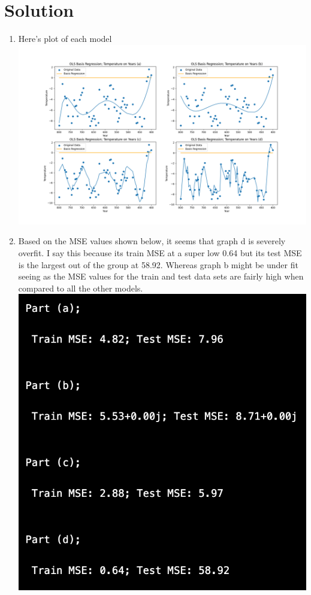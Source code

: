 \documentclass[submit]{harvardml}
\newenvironment{solution}
  {\color{blue}\section*{Solution}}
{}
\begin{document}
\begin{solution}
	\begin{enumerate}
	    \item Here's plot of each model \\
        \includegraphics[width=\textwidth]{images/p3.1.png}
        \item Based on the MSE values shown below, it seems that graph d is severely overfit. I say this because its train MSE at a super low 0.64 but its test MSE is the largest out of the group at 58.92. Whereas graph b might be under fit seeing as the MSE values for the train and test data sets are fairly high when compared to all the other models.\\
        \includegraphics[width=\textwidth]{images/q4.2.png}

\end{enumerate}
\end{solution}
\end{document}
